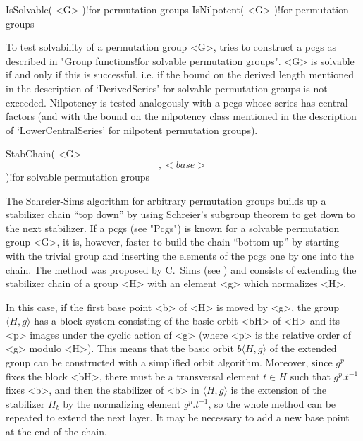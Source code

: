 \>IsSolvable( <G> )!{for permutation groups}
\>IsNilpotent( <G> )!{for permutation groups}

To test solvability of a permutation group <G>, {\GAP} tries to construct
a pcgs as described in "Group functions!for solvable permutation groups".
<G> is solvable if and  only if this is  successful, i.e. if the bound on
the  derived length mentioned in the   description of `DerivedSeries' for
solvable   permutation groups is    not  exceeded. Nilpotency is   tested
analogously with  a pcgs whose series has  central factors (and  with the
bound   on  the   nilpotency  class  mentioned  in    the description  of
`LowerCentralSeries' for nilpotent permutation groups).


\>StabChain( <G> \[, <base> \] )!{for solvable permutation groups}

The Schreier-Sims algorithm for  arbitrary permutation groups builds up a
stabilizer chain ``top down'' by using Schreier's subgroup theorem to get
down to the next stabilizer.   If a pcgs  (see  "Pcgs")  is known for   a
solvable permutation group <G>, it is, however, faster to build the chain
``bottom  up'' by starting  with  the  trivial  group and inserting   the
elements of the pcgs one by  one into the chain.  The method was proposed
by C.~Sims (see \cite{Sims90b}) and  consists of extending the stabilizer
chain of a group <H> with an element <g> which normalizes <H>.

\danger In this case, if the first base point <b> of <H> is moved by <g>,
the group $\langle H,g\rangle$ has a block system consisting of the basic
orbit <bH>   of <H> and  its <p>  images under the  cyclic action  of <g>
(where <p> is the relative order of <g> modulo <H>).  This means that the
basic orbit  $b\langle    H,g\rangle$  of the  extended     group can  be
constructed with a   simplified  orbit algorithm.  Moreover,  since $g^p$
fixes the block <bH>,  there must be a transversal  element $t\in H$ such
that $g^p.t^{-1}$ fixes <b>, and  then the stabilizer  of <b> in $\langle
H,g\rangle$  is the extension of the  stabilizer $H_b$ by the normalizing
element $g^p.t^{-1}$, so  the whole method  can be repeated to extend the
next layer. It may be necessary to add a new base point at the end of the
chain.

